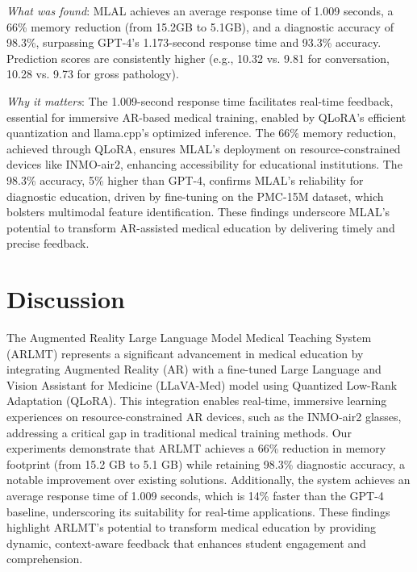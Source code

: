 \documentclass[10pt,letterpaper]{article}
\begin{document}
\textit{What was found}: MLAL achieves an average response time of 1.009 seconds, a 66\% memory reduction (from 15.2GB to 5.1GB), and a diagnostic accuracy of 98.3\%, surpassing GPT-4’s 1.173-second response time and 93.3\% accuracy. Prediction scores are consistently higher (e.g., 10.32 vs. 9.81 for conversation, 10.28 vs. 9.73 for gross pathology). 

\textit{Why it matters}: The 1.009-second response time facilitates real-time feedback, essential for immersive AR-based medical training, enabled by QLoRA’s efficient quantization and llama.cpp’s optimized inference. The 66\% memory reduction, achieved through QLoRA, ensures MLAL’s deployment on resource-constrained devices like INMO-air2, enhancing accessibility for educational institutions. The 98.3\% accuracy, 5\% higher than GPT-4, confirms MLAL’s reliability for diagnostic education, driven by fine-tuning on the PMC-15M dataset, which bolsters multimodal feature identification. These findings underscore MLAL’s potential to transform AR-assisted medical education by delivering timely and precise feedback.

\section*{Discussion}

The Augmented Reality Large Language Model Medical Teaching System (ARLMT) represents a significant advancement in medical education by integrating Augmented Reality (AR) with a fine-tuned Large Language and Vision Assistant for Medicine (LLaVA-Med) model using Quantized Low-Rank Adaptation (QLoRA). This integration enables real-time, immersive learning experiences on resource-constrained AR devices, such as the INMO-air2 glasses, addressing a critical gap in traditional medical training methods. Our experiments demonstrate that ARLMT achieves a 66\% reduction in memory footprint (from 15.2 GB to 5.1 GB) while retaining 98.3\% diagnostic accuracy, a notable improvement over existing solutions. Additionally, the system achieves an average response time of 1.009 seconds, which is 14\% faster than the GPT-4 baseline, underscoring its suitability for real-time applications. These findings highlight ARLMT's potential to transform medical education by providing dynamic, context-aware feedback that enhances student engagement and comprehension.
\end{document}
